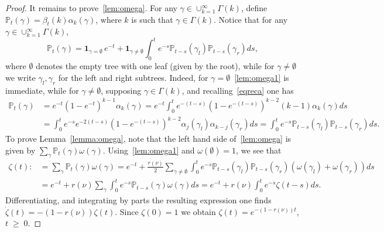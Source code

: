 \documentclass[10pt,a4paper]{article}
\renewcommand{\geq}{\;\geqslant\;}
\newcommand{\ind}{\mathbf{1}}
\newcommand{\bbP}{\mathbb{P}}
\let\a=\alpha
\let\b=\beta
\let\g=\gamma
\let\o=\omega
\let\z=\zeta
\let\G=\Gamma
\begin{document}
\begin{proof}
It remains to prove~\eqref{lem:omega}. For any $\g\in\cup_{k=1}^\infty\G(k)$, define $\bbP_t(\g) = \b_t(k)\alpha_k(\g)$, where $k$ is such that $\g\in\G(k)$. Notice that for any $\g\in\cup_{k=1}^\infty\G(k)$,
\begin{equation}\label{lem:omega1}
\bbP_t(\g) = \ind_{\g=\emptyset}\,e^{-t} + \ind_{\g\neq \emptyset}\int_0^t e^{-s}\bbP_{t-s}(\g_l)\bbP_{t-s}(\g_r)ds,
\end{equation}
where $\emptyset$ denotes the empty tree with one leaf (given by the root), while for $\g\neq \emptyset$ we write $\g_l,\g_r$ for the left and right subtrees. Indeed, for $\g=\emptyset$~\eqref{lem:omega1} is immediate, while for $\g\neq\emptyset$, supposing $\g\in\G(k)$, and recalling~\eqref{eqreca} one has
\begin{align*}
\bbP_{t}(\g) &= e^{-t}\left(1-e^{-t}\right)^{k-1}\a_k(\g) = e^{-t}\int_0^{t}e^{-(t-s)}\left(1-e^{-(t-s)}\right)^{k-2}(k-1)\a_k(\g)ds\\ &=
\int_0^t e^{-s}e^{-2(t-s)}\left(1-e^{-(t-s)}\right)^{k-2}\a_j(\g_l)\a_{k-j}(\g_r)ds =\int_0^t e^{-s} \bbP_{t-s}(\g_l)\bbP_{t-s}(\g_r)ds.
\end{align*}
To prove Lemma~\ref{lemma:omega}, note that the left hand side of~\eqref{lem:omega} is given by $\sum_\g \bbP_t(\g)\o(\g)$. Using~\eqref{lem:omega1} and $\o(\emptyset)=1$, we see that
\begin{align*}
\z(t):&=\sum_\g\bbP_{t}(\g)\o(\g) =e^{-t} +\frac{r(\nu)}2
\sum_{\g\neq\emptyset}\int_0^t e^{-s} \bbP_{t-s}(\g_l)\bbP_{t-s}(\g_r)(\o(\g_l)+\o(\g_r))ds\\
&=e^{-t} +r(\nu)
\sum_{\g}\int_0^t e^{-s} \bbP_{t-s}(\g)\o(\g)ds=e^{-t} +r(\nu)
\int_0^t e^{-s} \z(t-s)ds.
\end{align*}
Differentiating, and integrating by parts the resulting expression one finds $\dot\z(t) = -(1-r(\nu))\z(t)$. Since $\z(0)=1$ we obtain $\z(t)=e^{-(1-r(\nu))t}$, $t\geq 0$.
\end{proof}
\end{document}
